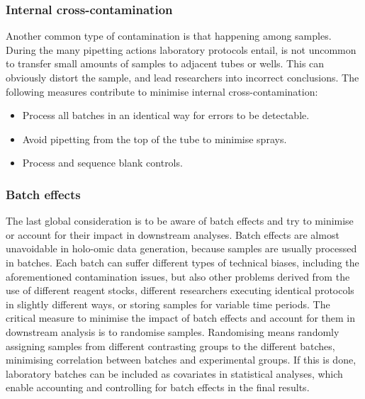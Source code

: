 \documentclass[
]{book}
\providecommand{\tightlist}{%
  \setlength{\itemsep}{0pt}\setlength{\parskip}{0pt}}
\begin{document}
\hypertarget{internal-cross-contamination}{%
\subsubsection*{Internal cross-contamination}\label{internal-cross-contamination}}

Another common type of contamination is that happening among samples. During the many pipetting actions laboratory protocols entail, is not uncommon to transfer small amounts of samples to adjacent tubes or wells. This can obviously distort the sample, and lead researchers into incorrect conclusions. The following measures contribute to minimise internal cross-contamination:

\begin{itemize}
\tightlist
\item
  Process all batches in an identical way for errors to be detectable.
\item
  Avoid pipetting from the top of the tube to minimise sprays.
\item
  Process and sequence blank controls.
\end{itemize}

\hypertarget{batch-effects}{%
\subsubsection*{Batch effects}\label{batch-effects}}

The last global consideration is to be aware of batch effects and try to minimise or account for their impact in downstream analyses. Batch effects are almost unavoidable in holo-omic data generation, because samples are usually processed in batches. Each batch can suffer different types of technical biases, including the aforementioned contamination issues, but also other problems derived from the use of different reagent stocks, different researchers executing identical protocols in slightly different ways, or storing samples for variable time periods. The critical measure to minimise the impact of batch effects and account for them in downstream analysis is to randomise samples. Randomising means randomly assigning samples from different contrasting groups to the different batches, minimising correlation between batches and experimental groups. If this is done, laboratory batches can be included as covariates in statistical analyses, which enable accounting and controlling for batch effects in the final results.
\end{document}
